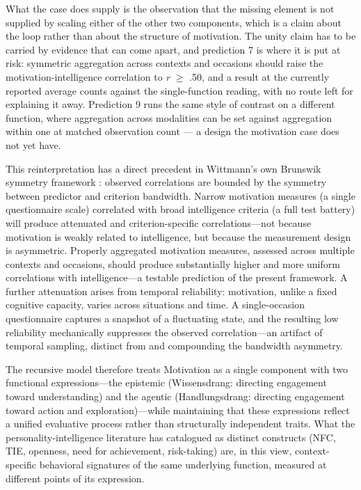 \documentclass[12pt,a4paper]{article}
\begin{document}
\begin{enumerate}
What the case does supply is the observation that the missing element is not supplied by scaling either of the other two components, which is a claim about the loop rather than about the structure of motivation. The unity claim has to be carried by evidence that can come apart, and prediction 7 is where it is put at risk: symmetric aggregation across contexts and occasions should raise the motivation-intelligence correlation to \emph{r} $\geq$ .50, and a result at the currently reported average counts against the single-function reading, with no route left for explaining it away. Prediction 9 runs the same style of contrast on a different function, where aggregation across modalities can be set against aggregation within one at matched observation count ---\hspace{0pt} a design the motivation case does not yet have.

This reinterpretation has a direct precedent in Wittmann's own Brunswik symmetry framework \citep{Wittmann1988,WittmannKlumb2006}: observed correlations are bounded by the symmetry between predictor and criterion bandwidth. Narrow motivation measures (a single questionnaire scale) correlated with broad intelligence criteria (a full test battery) will produce attenuated and criterion-specific correlations---\hspace{0pt}not because motivation is weakly related to intelligence, but because the measurement design is asymmetric. Properly aggregated motivation measures, assessed across multiple contexts and occasions, should produce substantially higher and more uniform correlations with intelligence---\hspace{0pt}a testable prediction of the present framework. A further attenuation arises from temporal reliability: motivation, unlike a fixed cognitive capacity, varies across situations and time. A single-occasion questionnaire captures a snapshot of a fluctuating state, and the resulting low reliability mechanically suppresses the observed correlation---\hspace{0pt}an artifact of temporal sampling, distinct from and compounding the bandwidth asymmetry.

The recursive model therefore treats Motivation as a single component with two functional expressions---\hspace{0pt}the epistemic (Wissensdrang: directing engagement toward understanding) and the agentic (Handlungsdrang: directing engagement toward action and exploration)---\hspace{0pt}while maintaining that these expressions reflect a unified evaluative process rather than structurally independent traits. What the personality-intelligence literature has catalogued as distinct constructs (NFC, TIE, openness, need for achievement, risk-taking) are, in this view, context-specific behavioral signatures of the same underlying function, measured at different points of its expression.


\end{enumerate}
\end{document}
